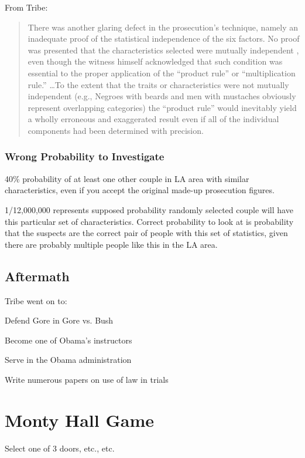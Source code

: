 \documentclass[landscape]{exam}
\begin{document}
  From Tribe:
  \begin{quote}
    \begin{em}
      There was another glaring defect in the prosecution’s technique, namely an
      inadequate proof of the statistical independence of the six factors. No
      proof was presented that the characteristics selected were mutually
      independent , even though the witness himself acknowledged that such
      condition was essential to the proper application of the ``product rule''
      or ``multiplication rule.'' \dots To the extent that the traits or
      characteristics were not mutually independent (e.g., Negroes with beards
      and men with mustaches obviously represent overlapping categories) the
      ``product rule'' would inevitably yield a wholly erroneous and exaggerated
      result even if all of the individual components had been determined with
      precision.
    \end{em}
  \end{quote}

  \subsubsection{Wrong Probability to Investigate}
    40\% probability of at least one other couple in LA area with similar
    characteristics, even if you accept the original made-up prosecution
    figures. 

    1/12,000,000 represents supposed probability randomly selected couple will
    have this particular set of characteristics. Correct probability to look at
    is probability that the suspects are the correct pair of people with this
    set of statistics, given there are probably multiple people like this in the
    LA area.


  \subsection{Aftermath}
  Tribe went on to:
  \begin{itemize*}
    \item Defend Gore in Gore vs. Bush
    \item Become one of Obama's instructors
    \item Serve in the Obama administration
    \item Write numerous papers on use of law in trials
  \end{itemize*}

  \section{Monty Hall Game}
  Select one of 3 doors, etc., etc.
\end{document}
